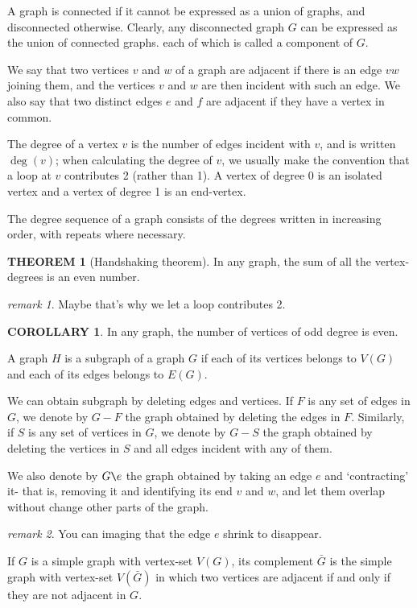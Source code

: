 \documentclass[a4paper,11pt]{article}%
\theoremstyle{remark}
\newtheorem*{remark}{remark}
\theoremstyle{definition}
\newtheorem{theorem}{THEOREM}[section]
\theoremstyle{definition}
\newtheorem{corollary}{COROLLARY}[section]
\theoremstyle{definition}
\theoremstyle{definition}
\theoremstyle{plain}
\theoremstyle{definition}
\begin{document}
A graph is connected if it cannot be expressed as a union of graphs, and 
disconnected otherwise. Clearly, any disconnected graph $G$ can be expressed 
as the union of connected graphs. each of which is called a component of $G$.

We say that two vertices $v$ and $w$ of a graph are adjacent if there is an edge 
$vw$ joining them, and the vertices $v$ and $w$ are then incident with such 
an edge. We also say that two distinct edges $e$ and $f$ are adjacent if they 
have a vertex in common.

The degree of a vertex $v$ is the number of edges incident with $v$,
and is written $\deg(v)$; when calculating the degree of $v$, we usually make 
the convention that a loop at $v$ contributes 2 (rather than 1). A vertex of degree 
0 is an isolated vertex and a vertex of degree 1 is an end-vertex.

The degree sequence of a graph consists of the degrees written in increasing 
order, with repeats where necessary.

\begin{theorem}[Handshaking theorem]
   In any graph, the sum of all the vertex-degrees is an even number. 
\end{theorem}
\begin{remark}
    Maybe that's why we let a loop contributes 2.
\end{remark}
\begin{corollary}
    In any graph, the number of vertices of odd degree is even.
\end{corollary}
A graph $H$ is a subgraph of a graph $G$ if each of its vertices belongs to $V(G)$ and 
each of its edges belongs to $E(G)$.

We can obtain subgraph by deleting edges and vertices. If $F$ is 
any set of edges in $G$, we denote by $G-F$ the graph obtained by deleting the 
edges in $F$. Similarly, if $S$ is any set of vertices in $G$, we denote 
by $G-S$ the graph obtained by deleting the vertices in $S$ and all 
edges incident with any of them.

We also denote by $G\verb|\|e$ the graph obtained by taking an edge $e$ and `contracting'
it- that is, removing it and identifying its end $v$ and $w$, and let them 
overlap without change other parts of the graph.
\begin{remark}
    You can imaging that the edge $e$ shrink to disappear.
\end{remark}
If $G$ is a simple graph with vertex-set $V(G)$, its complement $\bar{G}$
is the simple graph with vertex-set $V(\bar{G})$ in which two vertices are
adjacent if and only if they are not adjacent in $G$.
\end{document}
